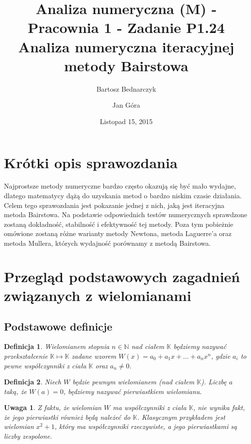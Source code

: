 \documentclass{article}
\title{Analiza numeryczna (M) - Pracownia 1 - Zadanie P1.24\\
Analiza numeryczna iteracyjnej metody Bairstowa}
\date{Listopad 15, 2015}
\author{Bartosz Bednarczyk\\ \and Jan Góra}
\newtheorem{remark}{Uwaga}
\newtheorem{definicja}{Definicja}
\begin{document}
\maketitle

\tableofcontents

\section{Krótki opis sprawozdania}

Najprostsze metody numeryczne bardzo często okazują się być mało wydajne, dlatego matematycy dążą do uzyskania metod o bardzo niskim czasie działania. Celem tego sprawozdania jest pokazanie jednej z nich, jaką jest iteracyjna metoda Bairstowa. Na podstawie odpowiednich testów numerycznych sprawdzone zostaną dokładność, stabilność i efektywność tej metody. Poza tym pobieżnie omówione zostaną różne warianty metody Newtona, metoda Laguerre'a oraz metoda Mullera, których wydajność porównamy z metodą Bairstowa.	
\section{Przegląd podstawowych zagadnień związanych z wielomianami}

\subsection{Podstawowe definicje}

\begin{definicja}
Wielomianem stopnia $n \in \mathbb{N}$ nad ciałem $\mathbb{K}$ będziemy nazywać przekształcenie $\mathbb{K} \mapsto \mathbb{K}$ zadane wzorem $W(x) = a_0 + a_1x + \ldots + a_n x^n$, gdzie $a_i$ to pewne  współczynniki z ciała $\mathbb{K}$ oraz $a_n \neq 0$.
\end{definicja}

\begin{definicja}
Niech $W$ będzie pewnym wielomianem (nad ciałem $\mathbb{K}$). Liczbę $a$ taką, że $W(a) = 0$, będziemy nazywać pierwiastkiem wielomianu.
\end{definicja}

\begin{remark}
Z faktu, że wielomian $W$ ma współczynniki z ciała $\mathbb{K}$, nie wynika fakt, że jego pierwiastki również będą należeć do $\mathbb{K}$. Klasycznym przykładem jest wielomian $x^2 + 1$, który ma współczynniki rzeczywiste, a jego pierwiastkami są liczby zespolone.
\end{remark}
\end{document}
